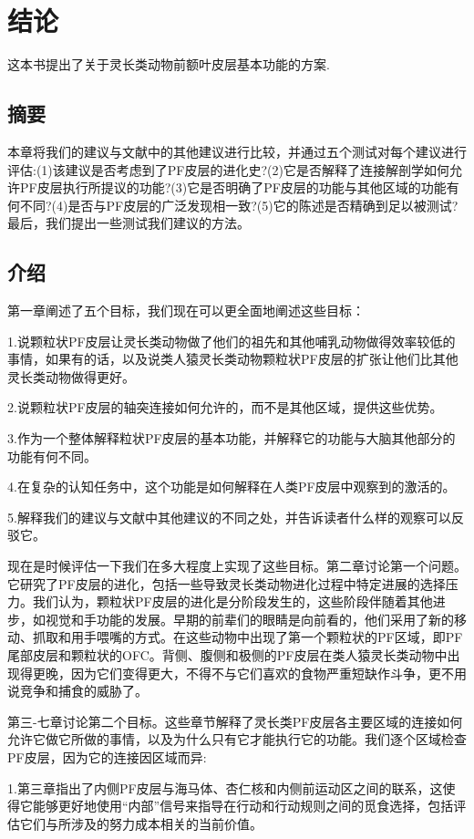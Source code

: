 \chapter{结论} \label{chap:chap10}
这本书提出了关于灵长类动物前额叶皮层基本功能的方案.

\section{摘要}
本章将我们的建议与文献中的其他建议进行比较，并通过五个测试对每个建议进行评估:(1)该建议是否考虑到了PF皮层的进化史?(2)它是否解释了连接解剖学如何允许PF皮层执行所提议的功能?(3)它是否明确了PF皮层的功能与其他区域的功能有何不同?(4)是否与PF皮层的广泛发现相一致?(5)它的陈述是否精确到足以被测试?最后，我们提出一些测试我们建议的方法。
\section{介绍}
第一章阐述了五个目标，我们现在可以更全面地阐述这些目标：
\par
1.说颗粒状PF皮层让灵长类动物做了他们的祖先和其他哺乳动物做得效率较低的事情，如果有的话，以及说类人猿灵长类动物颗粒状PF皮层的扩张让他们比其他灵长类动物做得更好。
\par
2.说颗粒状PF皮层的轴突连接如何允许的，而不是其他区域，提供这些优势。
\par
3.作为一个整体解释粒状PF皮层的基本功能，并解释它的功能与大脑其他部分的功能有何不同。
\par 
4.在复杂的认知任务中，这个功能是如何解释在人类PF皮层中观察到的激活的。
\par 
5.解释我们的建议与文献中其他建议的不同之处，并告诉读者什么样的观察可以反驳它。
\par 
现在是时候评估一下我们在多大程度上实现了这些目标。第二章讨论第一个问题。它研究了PF皮层的进化，包括一些导致灵长类动物进化过程中特定进展的选择压力。我们认为，颗粒状PF皮层的进化是分阶段发生的，这些阶段伴随着其他进步，如视觉和手功能的发展。早期的前辈们的眼睛是向前看的，他们采用了新的移动、抓取和用手喂嘴的方式。在这些动物中出现了第一个颗粒状的PF区域，即PF尾部皮层和颗粒状的OFC。背侧、腹侧和极侧的PF皮层在类人猿灵长类动物中出现得更晚，因为它们变得更大，不得不与它们喜欢的食物严重短缺作斗争，更不用说竞争和捕食的威胁了。
\par 
第三-七章讨论第二个目标。这些章节解释了灵长类PF皮层各主要区域的连接如何允许它做它所做的事情，以及为什么只有它才能执行它的功能。我们逐个区域检查PF皮层，因为它的连接因区域而异:
\par 
1.第三章指出了内侧PF皮层与海马体、杏仁核和内侧前运动区之间的联系，这使得它能够更好地使用“内部”信号来指导在行动和行动规则之间的觅食选择，包括评估它们与所涉及的努力成本相关的当前价值。
